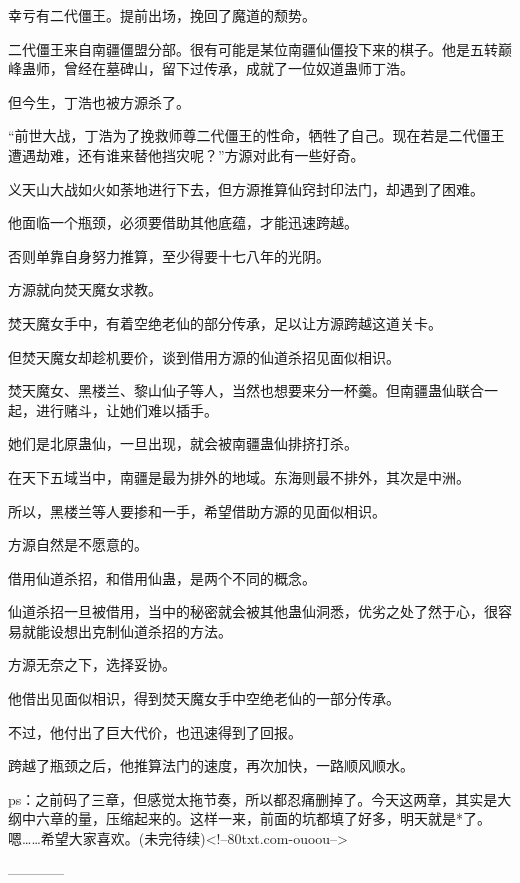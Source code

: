 \begin{this_body}
幸亏有二代僵王。提前出场，挽回了魔道的颓势。

二代僵王来自南疆僵盟分部。很有可能是某位南疆仙僵投下来的棋子。他是五转巅峰蛊师，曾经在墓碑山，留下过传承，成就了一位奴道蛊师丁浩。

但今生，丁浩也被方源杀了。

“前世大战，丁浩为了挽救师尊二代僵王的性命，牺牲了自己。现在若是二代僵王遭遇劫难，还有谁来替他挡灾呢？”方源对此有一些好奇。

义天山大战如火如荼地进行下去，但方源推算仙窍封印法门，却遇到了困难。

他面临一个瓶颈，必须要借助其他底蕴，才能迅速跨越。

否则单靠自身努力推算，至少得要十七八年的光阴。

方源就向焚天魔女求教。

焚天魔女手中，有着空绝老仙的部分传承，足以让方源跨越这道关卡。

但焚天魔女却趁机要价，谈到借用方源的仙道杀招见面似相识。

焚天魔女、黑楼兰、黎山仙子等人，当然也想要来分一杯羹。但南疆蛊仙联合一起，进行赌斗，让她们难以插手。

她们是北原蛊仙，一旦出现，就会被南疆蛊仙排挤打杀。

在天下五域当中，南疆是最为排外的地域。东海则最不排外，其次是中洲。

所以，黑楼兰等人要掺和一手，希望借助方源的见面似相识。

方源自然是不愿意的。

借用仙道杀招，和借用仙蛊，是两个不同的概念。

仙道杀招一旦被借用，当中的秘密就会被其他蛊仙洞悉，优劣之处了然于心，很容易就能设想出克制仙道杀招的方法。

方源无奈之下，选择妥协。

他借出见面似相识，得到焚天魔女手中空绝老仙的一部分传承。

不过，他付出了巨大代价，也迅速得到了回报。

跨越了瓶颈之后，他推算法门的速度，再次加快，一路顺风顺水。

ps：之前码了三章，但感觉太拖节奏，所以都忍痛删掉了。今天这两章，其实是大纲中六章的量，压缩起来的。这样一来，前面的坑都填了好多，明天就是*了。嗯……希望大家喜欢。(未完待续)<!--80txt.com-ouoou-->

------------

\end{this_body}

